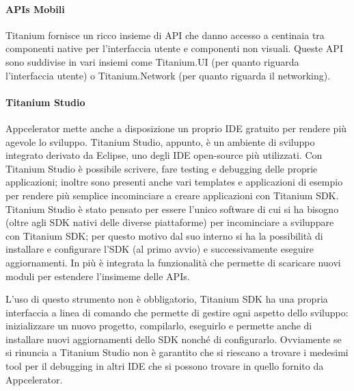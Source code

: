 			\paragraph{APIs Mobili}
				Titanium fornisce un ricco insieme di API \js{} che danno 
				accesso a centinaia tra componenti native per l'interfaccia 
				utente e componenti non visuali. Queste API sono suddivise in 
				vari insiemi come Titanium.UI (per quanto riguarda l'interfaccia 
				utente) o Titanium.Network (per quanto riguarda il networking).
				 
			\paragraph{Titanium Studio}
				Appcelerator mette anche a disposizione un proprio IDE gratuito 
				per rendere più agevole lo sviluppo. Titanium Studio, appunto, è 
				un ambiente di sviluppo integrato derivato da Eclipse, uno degli 
				IDE open-source più utilizzati. Con Titanium Studio è possibile 
				scrivere, fare testing e debugging delle proprie applicazioni; 
				inoltre sono presenti anche vari templates e applicazioni di 
				esempio per rendere più semplice incominciare a creare 
				applicazioni con Titanium SDK. Titanium Studio è stato 
				pensato per essere l'unico software di cui si ha bisogno (oltre 
				agli SDK nativi delle diverse piattaforme) per incominciare a 
				sviluppare con Titanium SDK; per questo motivo dal suo interno 
				si ha la possibilità di installare e configurare l'SDK (al primo 
				avvio) e successivamente eseguire aggiornamenti. In più è
				integrata la funzionalità che permette di scaricare nuovi moduli 
				per	estendere l'insimeme delle APIs.
				
				L'uso di questo strumento non è obbligatorio, Titanium SDK 
				ha una propria interfaccia a linea di comando che permette di 
				gestire ogni aspetto dello sviluppo: inizializzare un 
				nuovo progetto, compilarlo, eseguirlo e permette anche di 
				installare nuovi aggiornamenti dello SDK nonché di configurarlo.
				Ovviamente se si rinuncia a Titanium Studio non è garantito che 
				si riescano a trovare i medesimi tool per il debugging in altri 
				IDE che si possono trovare in quello fornito da Appcelerator.
				
